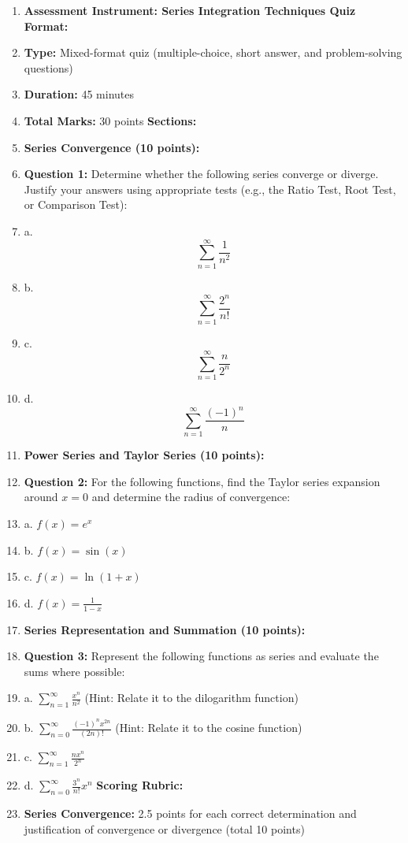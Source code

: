 \begin{enumerate}
    \item \textbf{Assessment Instrument: Series Integration Techniques Quiz} \textbf{Format:}
    \item \textbf{Type:} Mixed-format quiz (multiple-choice, short answer, and problem-solving questions)
    \item \textbf{Duration:} 45 minutes
    \item \textbf{Total Marks:} 30 points \textbf{Sections:}
    \item \textbf{Series Convergence (10 points):}
    \item \textbf{Question 1:} Determine whether the following series converge or diverge. Justify your answers using appropriate tests (e.g., the Ratio Test, Root Test, or Comparison Test):
    \item a. $$\sum_{n=1}^{\infty} \frac{1}{n^2}$$
    \item b. $$\sum_{n=1}^{\infty} \frac{2^n}{n!}$$
    \item c. $$\sum_{n=1}^{\infty} \frac{n}{2^n}$$
    \item d. $$\sum_{n=1}^{\infty} \frac{(-1)^n}{n}$$
    \item \textbf{Power Series and Taylor Series (10 points):}
    \item \textbf{Question 2:} For the following functions, find the Taylor series expansion around \( x = 0 \) and determine the radius of convergence:
    \item a. \( f(x) = e^x \)
    \item b. \( f(x) = \sin(x) \)
    \item c. \( f(x) = \ln(1 + x) \)
    \item d. \( f(x) = \frac{1}{1 - x} \)
    \item \textbf{Series Representation and Summation (10 points):}
    \item \textbf{Question 3:} Represent the following functions as series and evaluate the sums where possible:
    \item a. \( \sum_{n=1}^{\infty} \frac{x^n}{n^2} \) (Hint: Relate it to the dilogarithm function)
    \item b. \( \sum_{n=0}^{\infty} \frac{(-1)^n x^{2n}}{(2n)!} \) (Hint: Relate it to the cosine function)
    \item c. \( \sum_{n=1}^{\infty} \frac{n x^n}{2^n} \)
    \item d. \( \sum_{n=0}^{\infty} \frac{3^n}{n!} x^n \) \textbf{Scoring Rubric:}
    \item \textbf{Series Convergence:} 2.5 points for each correct determination and justification of convergence or divergence (total 10 points)

\end{enumerate}
